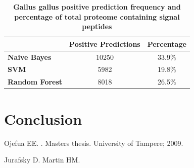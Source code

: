 \documentclass[10pt,letterpaper]{article}
\begin{document}
	\begin{table}[!ht]
		\centering
		\caption{{\bf Gallus gallus positive prediction frequency and percentage of total proteome containing signal peptides}}
		\label{tab:chicken}
		\begin{tabular}{@{}lcc@{}}
			\toprule
			& \multicolumn{1}{l}{Positive Predictions} & \multicolumn{1}{l}{Percentage} \\ \midrule
			\textbf{Naive Bayes}   & 10250                                    & 33.9\%                         \\
			\textbf{SVM}           & 5982                                     & 19.8\%                         \\
			\textbf{Random Forest} & 8018                                     & 26.5\%                        
		\end{tabular}
	\end{table}
	
	\section*{Conclusion}
	
	

	\nolinenumbers
	
	\begin{thebibliography}{10}
		
		Ojefua EE.
		.
		\newblock Masters thesis. University of Tampere; 2009.
		
		Jurafsky D. Martin HM.
		
	\end{thebibliography}
	
	
	
\end{document}
